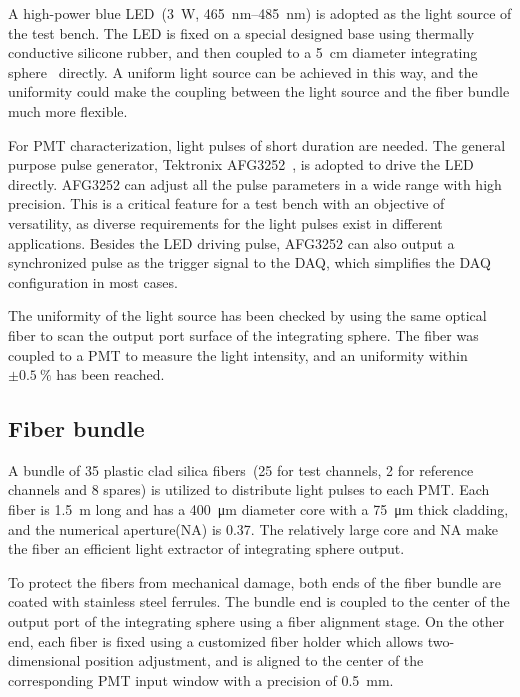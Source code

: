 \documentclass[a4paper,10pt,twoside]{cpc-hepnp}
\begin{document}
\begin{CJK*}{UTF8}{gbsn}
\begin{multicols}{2}
A high-power blue LED~\citep{z-light}(\SI{3}{\watt},  \SIrange{465}{485}{\nano\meter}) is adopted as the light source of the test bench.
The LED is fixed on a special designed base using thermally conductive silicone rubber, and then coupled to a  \SI{5}{\centi\meter} diameter integrating sphere~\citep{integrating_sphere} directly.
A uniform light source can be achieved in this way, and the uniformity could make the coupling between the light source and the fiber bundle much more flexible.

For PMT characterization, light pulses of short duration are needed.
The general purpose pulse generator, Tektronix AFG3252~\citep{afg3252}, is adopted to drive the LED directly.
AFG3252 can adjust all the pulse parameters in a wide range with high precision. This is a critical feature for a test bench with an objective of versatility, as diverse requirements for the light pulses exist in different applications. 
Besides the LED driving pulse, AFG3252 can also output a synchronized pulse as the trigger signal to the DAQ, which  simplifies the DAQ configuration in most cases. 

The uniformity of the light source has been checked by using the same optical fiber to scan the output port surface of the integrating sphere. The fiber was coupled to a PMT to measure the light intensity, and an uniformity within $\pm\SI{0.5}{\percent}$ has been reached.

\subsection{Fiber bundle}
\label{sec:fiber_bundle}

A bundle of 35 plastic clad silica fibers~\citep{optical_fibre}(25 for test channels, 2 for reference channels and 8 spares) is utilized to distribute light pulses to each PMT.
Each fiber is \SI{1.5}{\meter} long and has a \SI{400}{\micro\meter} diameter core with a \SI{75}{\micro\meter} thick cladding, and the numerical aperture(NA) is 0.37.
The relatively large core and NA make the fiber an efficient light extractor of integrating sphere output. 

To protect the fibers from mechanical damage, both ends of the fiber bundle are coated with stainless steel ferrules.
The bundle end is coupled to the center of the output port of the integrating sphere using a fiber alignment stage.
On the other end, each fiber is fixed using a customized fiber holder which allows two-dimensional position adjustment, and is aligned to the center of the corresponding PMT input window with a precision of \SI{0.5}{\milli\meter}.


\end{multicols}
\end{CJK*}
\end{document}
